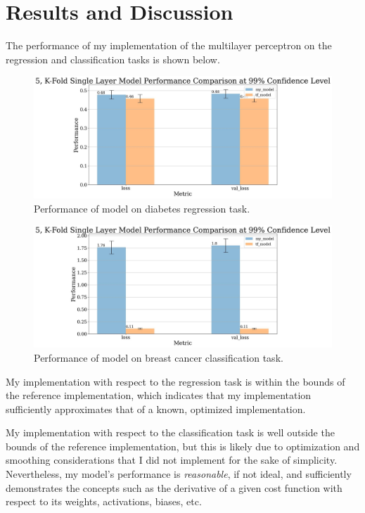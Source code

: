 \documentclass{article}
\begin{document}
\section{Results and Discussion}

The performance of my implementation of the multilayer perceptron on the
regression and classification tasks is shown below.

\afterpage

\begin{figure}[h]
	\includegraphics[scale=0.35]{one_layer_regressor_bar_chart.jpg}
	\caption{Performance of model on diabetes regression task.}
\end{figure}

\begin{figure}[h]
	\includegraphics[scale=0.35]{one_layer_classifier_bar_chart.jpg}
	\caption{Performance of model on breast cancer classification task.}
\end{figure}

\clearpage

My implementation with respect to the regression task is within the bounds
of the  reference implementation, which indicates that
my implementation sufficiently approximates that of a known, optimized
implementation.

My implementation with respect to the classification task is well outside the
bounds of the  reference implementation, but this is likely
due to optimization and smoothing considerations that I did not implement for
the sake of simplicity. Nevertheless, my model's performance is \textit{reasonable},
if not ideal, and sufficiently demonstrates the concepts such as the
derivative of a given cost function with respect to
its weights, activations, biases, etc.
\end{document}
